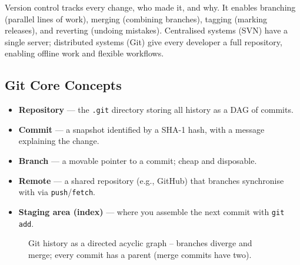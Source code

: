 Version control tracks every change, who made it, and why. It enables branching (parallel lines of work), merging (combining branches), tagging (marking releases), and reverting (undoing mistakes). Centralised systems (SVN) have a single server; distributed systems (Git) give every developer a full repository, enabling offline work and flexible workflows.

\subsection{Git Core Concepts}

\begin{itemize}
    \item \textbf{Repository} --- the \texttt{.git} directory storing all history as a DAG of commits.
    \item \textbf{Commit} --- a snapshot identified by a SHA-1 hash, with a message explaining the change.
    \item \textbf{Branch} --- a movable pointer to a commit; cheap and disposable.
    \item \textbf{Remote} --- a shared repository (e.g., GitHub) that branches synchronise with via \texttt{push}/\texttt{fetch}.
    \item \textbf{Staging area (index)} --- where you assemble the next commit with \texttt{git add}.
\end{itemize}

\begin{figure}[h]
\centering
{}
\caption{Git history as a directed acyclic graph -- branches diverge and merge; every commit has a parent (merge commits have two).}
\end{figure}

